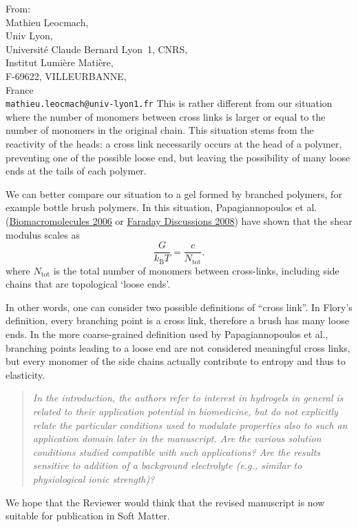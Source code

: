 \documentclass[a4paper, parskip=true, firsthead=false, fromemail=true, foldmarks=false]{scrlttr2}
\newenvironment{quotationi}
{\begin{quotation}\itshape}
{\end{quotation}}
\newcommand{\journal}{Soft Matter}
\begin{document}
\begin{letter}{From:\\
Mathieu Leocmach,\\
Univ Lyon,\\ 
Universit\'e Claude Bernard Lyon~1, CNRS,\\
Institut Lumi\`ere Mati\`ere,\\
F-69622, VILLEURBANNE,\\
France\\
\texttt{mathieu.leocmach@univ-lyon1.fr}
}
This is rather different from our situation where the number of monomers between cross links is larger or equal to the number of monomers in the original chain. This situation stems from the reactivity of the heads: a cross link necessarily occurs at the head of a polymer, preventing one of the possible loose end, but leaving the possibility of many loose ends at the tails of each polymer.

We can better compare our situation to a gel formed by branched polymers, for example bottle brush polymers. In this situation, Papagiannopoulos et al. (\href{http://doi.org/10.1021/bm060287d}{Biomacromolecules 2006} or \href{http://doi.org/10.1039/b714864j}{Faraday Discussions 2008}) have shown that the shear modulus scales as
\begin{equation}
\frac{G}{k_\mathrm{B}T} = \frac{c}{N_\mathrm{tot}}.
\end{equation}
where $N_\mathrm{tot}$ is the total number of monomers between cross-links, including side chains that are topological `loose ends'. 

In other words, one can consider two possible definitions of ``cross link''. In Flory's definition, every branching point is a cross link, therefore a brush has many loose ends. In the more coarse-grained definition used by Papagiannopoulos et al., branching points leading to a loose end are not considered meaningful cross links, but every monomer of the side chains actually contribute to entropy and thus to elasticity.


\begin{quotationi}
In the introduction, the authors refer to interest in hydrogels in general is related to their application potential in biomedicine, but do not explicitly relate the particular conditions used to modulate properties also to such an application domain later in the manuscript. Are the various solution conditions studied compatible with such applications? Are the results sensitive to addition of a background electrolyte (e.g., similar to physiological ionic strength)?

\end{quotationi}



We hope that the Reviewer would think that the revised manuscript is now suitable for publication in \journal. 


\end{letter} 
\end{document}
